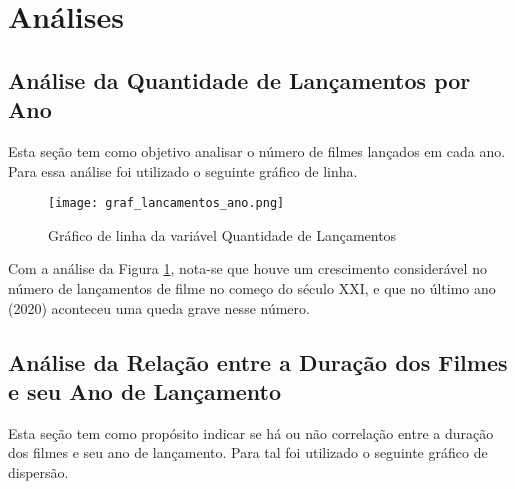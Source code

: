 \documentclass[a4paper, 12pt]{article} %
\begin{document}


\newpage
\section{Análises}



\subsection{Análise da Quantidade de Lançamentos por Ano}

Esta seção tem como objetivo analisar o número de filmes lançados em cada ano. Para essa análise foi utilizado o seguinte gráfico de linha.

\begin{figure}[H]
\cantering
\caption{Gráfico de linha da variável Quantidade de Lançamentos}
\label{graf_lancamentos_ano}
\texttt{[image: graf\_lancamentos\_ano.png]}
\end{figure}




Com a análise da Figura \ref{graf_lancamentos_ano}, nota-se que houve um crescimento considerável no número de lançamentos de filme no começo do século XXI, e que no último ano (2020) aconteceu uma queda grave nesse número. %


\subsection{Análise da Relação entre a Duração dos Filmes e seu Ano de Lançamento}

Esta seção tem como propósito indicar se há ou não correlação entre a duração dos filmes e seu ano de lançamento. Para tal foi utilizado o seguinte gráfico de dispersão.
\end{document}
